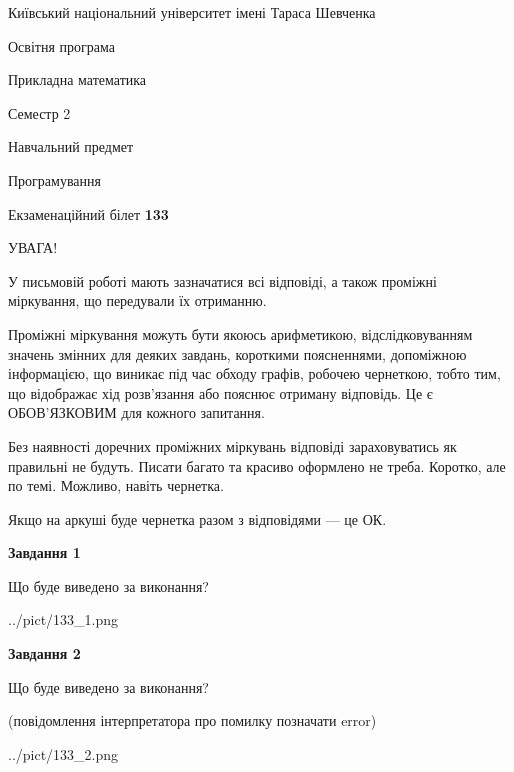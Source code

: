 \documentclass[12pt, ukrainian]{article}
\begin{document}
{{\begin {small}\par
{ \center  Київський національний університет імені Тараса Шевченка \par}
{\parbox {5 cm}{Освітня програма \hfill}{\parbox {7 cm}{Прикладна математика\hfill}}\parbox {6 cm}{\hfill Семестр 2}}\par
{\parbox {5 cm} {Навчальний предмет \hfill}\parbox {7 cm}{Програмування \hfill}\parbox {6cm}{\hfill}\par}\vspace{-7pt} \end{small}}{\center Екзаменаційний білет \No \textbf
{ 133 }\par}}
{
\begin {large}
УВАГА!

У письмовій роботі мають зазначатися всі відповіді, а також проміжні міркування, що передували їх отриманню.

Проміжні міркування можуть бути якоюсь арифметикою, відслідковуванням зна\-чень змінних для деяких завдань,
короткими поясненнями, допоміжною інформацією, що виникає під час обходу графів, робочею чернеткою,
тобто тим, що відображає хід розв’язання або пояснює отриману відповідь.
Це є ОБОВ’ЯЗКОВИМ для кожного запитання.

Без наявності доречних проміжних міркувань відповіді зараховуватись як правиль\-ні не будуть.
Писати багато та красиво оформлено не треба. Коротко, але по темі. Можли\-во, навіть чернетка.

Якщо на аркуші буде чернетка разом з відповідями --- це ОК.

\newpage

{\begin {center}\textbf{Завдання 1}\end {center}}\par
Що буде виведено за виконання?\par
\begin{center}
	{../pict/133_1.png}
\end{center}
\newpage

{\begin {center}\textbf{Завдання 2}\end {center}}\par
Що буде виведено за виконання?\par
 (повідомлення інтерпретатора про помилку позначати error)\par
\begin{center}
	{../pict/133_2.png}
\end{center}
\newpage


\end{large}}
\end{document}
